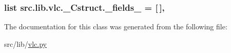 \subsubsection[{\+\_\+fields\+\_\+}]{\setlength{\rightskip}{0pt plus 5cm}list src.\+lib.\+vlc.\+\_\+\+Cstruct.\+\_\+fields\+\_\+ = \mbox{[}$\,$\mbox{]}\hspace{0.3cm}{\ttfamily [static]}, {\ttfamily [private]}}\label{classsrc_1_1lib_1_1vlc_1_1__Cstruct_a6503fe1f19dd39cab7b175dd1cf11e8a}


The documentation for this class was generated from the following file\+:\begin{DoxyCompactItemize}
\item 
src/lib/\hyperlink{vlc_8py}{vlc.\+py}\end{DoxyCompactItemize}

